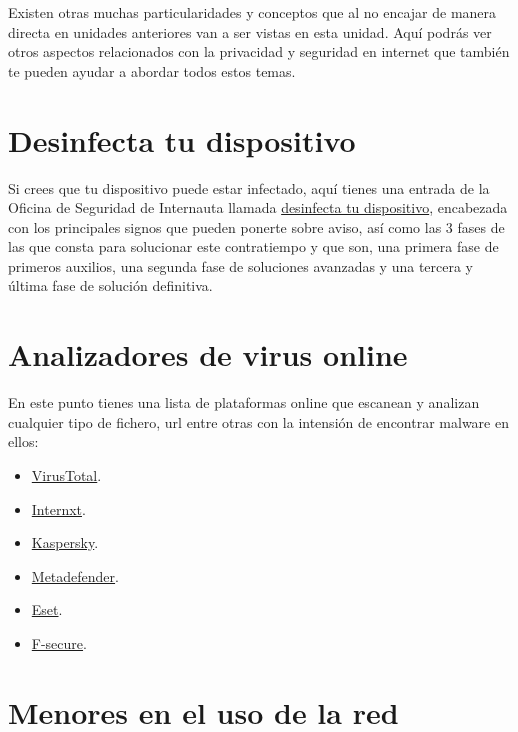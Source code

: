 \documentclass[
  a4paper,
  openany]{book}
\begin{document}
Existen otras muchas particularidades y conceptos que al no encajar de manera directa en unidades anteriores van a ser vistas en esta unidad. Aquí podrás ver otros aspectos relacionados con la privacidad y seguridad en internet que también te pueden ayudar a abordar todos estos temas.

\hypertarget{desinfecta-tu-dispositivo}{%
\section{Desinfecta tu dispositivo}\label{desinfecta-tu-dispositivo}}

Si crees que tu dispositivo puede estar infectado, aquí tienes una entrada de la Oficina de Seguridad de Internauta llamada \href{https://www.osi.es/es/desinfecta-tu-ordenador}{desinfecta tu dispositivo}, encabezada con los principales signos que pueden ponerte sobre aviso, así como las 3 fases de las que consta para solucionar este contratiempo y que son, una primera fase de primeros auxilios, una segunda fase de soluciones avanzadas y una tercera y última fase de solución definitiva.

\hypertarget{analizadores-de-virus-online}{%
\section{Analizadores de virus online}\label{analizadores-de-virus-online}}

En este punto tienes una lista de plataformas online que escanean y analizan cualquier tipo de fichero, url entre otras con la intensión de encontrar malware en ellos:

\begin{itemize}
\item
  \href{https://www.virustotal.com/gui/home/upload}{VirusTotal}.
\item
  \href{https://internxt.com/es/virus-scanner}{Internxt}.
\item
  \href{https://opentip.kaspersky.com/}{Kaspersky}.
\item
  \href{https://metadefender.opswat.com}{Metadefender}.
\item
  \href{https://eset.com}{Eset}.
\item
  \href{https://www.f-secure.com}{F-secure}.
\end{itemize}

\hypertarget{menores-en-el-uso-de-la-red}{%
\section{Menores en el uso de la red}\label{menores-en-el-uso-de-la-red}}
\end{document}
